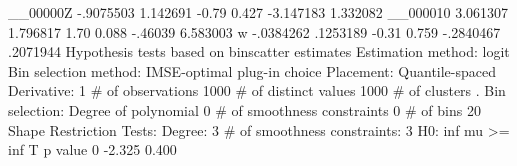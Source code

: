     __00000Z {\VBAR}  -.9075503   1.142691    -0.79   0.427    -3.147183    1.332082
    __000010 {\VBAR}   3.061307   1.796817     1.70   0.088      -.46039    6.583003
           w {\VBAR}  -.0384262   .1253189    -0.31   0.759    -.2840467    .2071944
{\smallskip}
Hypothesis tests based on binscatter estimates
Estimation method: logit
Bin selection method: IMSE-optimal plug-in choice
Placement: Quantile-spaced
Derivative: 1
{\smallskip}
\# of observations             {\VBAR}    1000
\# of distinct values          {\VBAR}    1000
\# of clusters                 {\VBAR}       .
Bin selection:                {\VBAR} 
         Degree of polynomial {\VBAR}       0
  \# of smoothness constraints {\VBAR}       0
                    \# of bins {\VBAR}      20
{\smallskip}
Shape Restriction Tests:
Degree: 3     \# of smoothness constraints: 3
{\smallskip}
H0: inf mu >=      {\VBAR} inf T             p value
         0         {\VBAR}  -2.325             0.400
